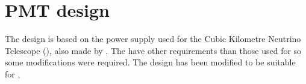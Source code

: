 \chapter{PMT design}
\label{ch:pmt_design}

The design is based on the \pmt power supply used for the Cubic Kilometre Neutrino Telescope (\kmnet), also made by \nikhef. The \kmnet \pmts have other requirements than those used for \hisparc so some modifications were required. The \kmnet design has been modified to be suitable for \hisparc,
